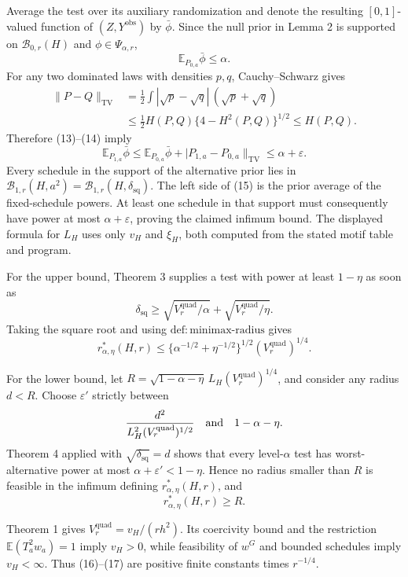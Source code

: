 Average the test over its auxiliary randomization and denote the resulting \([0,1]\)-valued function of \((Z,Y^{\mathrm{obs}})\) by \(\bar\phi\).  Since the null prior in Lemma 2 is supported on \(\mathcal B_{0,r}(H)\) and \(\phi\in\Psi_{\alpha,r}\),
\[
\mathbb E_{P_{0,a}}\bar\phi\le\alpha. \tag{14}
\]
For any two dominated laws with densities \(p,q\), Cauchy--Schwarz gives
\[
\begin{aligned}
\|P-Q\|_{\mathrm{TV}}
&=\frac12\int|\sqrt p-\sqrt q|\,(\sqrt p+\sqrt q)\\
&\le\frac12H(P,Q)\{4-H^2(P,Q)\}^{1/2}\le H(P,Q).
\end{aligned}
\]
Therefore (13)--(14) imply
\[
\mathbb E_{P_{1,a}}\bar\phi
\le\mathbb E_{P_{0,a}}\bar\phi+|P_{1,a}-P_{0,a}\|_{\mathrm{TV}}
\le\alpha+\varepsilon. \tag{15}
\]
Every schedule in the support of the alternative prior lies in \(\mathcal B_{1,r}(H,a^2)=\mathcal B_{1,r}(H,\delta_{\mathrm{sq}})\).  The left side of (15) is the prior average of the fixed-schedule powers.  At least one schedule in that support must consequently have power at most \(\alpha+\varepsilon\), proving the claimed infimum bound.  The displayed formula for \(L_H\) uses only \(v_H\) and \(\xi_H\), both computed from the stated motif table and program.

For the upper bound, Theorem 3 supplies a test with power at least \(1-\eta\) as soon as
\[
\delta_{\mathrm{sq}}
\ge \sqrt{V_r^{\mathrm{quad}}/\alpha}+\sqrt{V_r^{\mathrm{quad}}/\eta}.
\]
Taking the square root and using \(\mathrm{def:minimax\text{-}radius}\) gives
\[
r^*_{\alpha,\eta}(H,r)
\le\{\alpha^{-1/2}+\eta^{-1/2}\}^{1/2}(V_r^{\mathrm{quad}})^{1/4}. \tag{16}
\]

For the lower bound, let \(R=\sqrt{1-\alpha-\eta}\,L_H(V_r^{\mathrm{quad}})^{1/4}\), and consider any radius \(d<R\).  Choose \(\varepsilon'\) strictly between
\[
\frac{d^2}{L_H^2(V_r^{\mathrm{quad}})^{1/2}}
\quad\hbox{and}\quad 1-\alpha-\eta.
\]
Theorem 4 applied with \(\sqrt{\delta_{\mathrm{sq}}}=d\) shows that every level-\(\alpha\) test has worst-alternative power at most \(\alpha+\varepsilon'<1-\eta\).  Hence no radius smaller than \(R\) is feasible in the infimum defining \(r^*_{\alpha,\eta}(H,r)\), and
\[
r^*_{\alpha,\eta}(H,r)\ge R. \tag{17}
\]

Theorem 1 gives \(V_r^{\mathrm{quad}}=v_H/(rh^2)\).  Its coercivity bound and the restriction \(\mathbb E(T_a^2w_a)=1\) imply \(v_H>0\), while feasibility of \(w^G\) and bounded schedules imply \(v_H<\infty\).  Thus (16)--(17) are positive finite constants times \(r^{-1/4}\).

